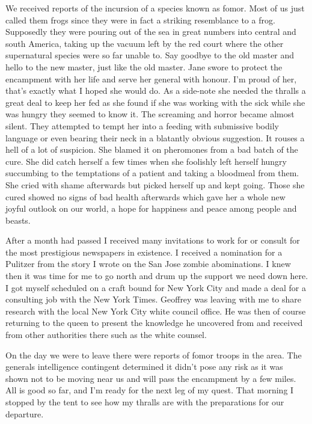 We received reports of the incursion of a species known as fomor. Most of us just called them frogs since they were in fact a striking resemblance to a frog. Supposedly they were pouring out of the sea in great numbers into central and south America, taking up the vacuum left by the red court where the other supernatural species were so far unable to. Say goodbye to the old master and hello to the new master, just like the old master. Jane swore to protect the encampment with her life and serve her general with honour. I'm proud of her, that's exactly what I hoped she would do. As a side-note she needed the thralls a great deal to keep her fed as she found if she was working with the sick while she was hungry they seemed to know it. The screaming and horror became almost silent. They attempted to tempt her into a feeding with submissive bodily language or even bearing their neck in a blatantly obvious suggestion. It rouses a hell of a lot of suspicion. She blamed it on pheromones from a bad batch of the cure. She did catch herself a few times when she foolishly left herself hungry succumbing to the temptations of a patient and taking a bloodmeal from them. She cried with shame afterwards but picked herself up and kept going. Those she cured showed no signs of bad health afterwards which gave her a whole new joyful outlook on our world, a hope for happiness and peace among people and beasts.

After a month had passed I received many invitations to work for or consult for the most prestigious newspapers in existence. I received a nomination for a Pulitzer from the story I wrote on the San Jose zombie abominations. I knew then it was time for me to go north and drum up the support we need down here. I got myself scheduled on a craft bound for New York City and made a deal for a consulting job with the New York Times. Geoffrey was leaving with me to share \chichenitza* research with the local New York City white council office. He was then of course returning to the queen to present the knowledge he uncovered from \chichenitza* and received from other authorities there such as the white counsel.

On the day we were to leave there were reports of fomor troops in the area. The generals intelligence contingent determined it didn't pose any risk as it was shown not to be moving near us and will pass the encampment by a few miles. All is good so far, and I'm ready for the next leg of my quest. That morning I stopped by the tent to see how my thralls are with the preparations for our departure.

